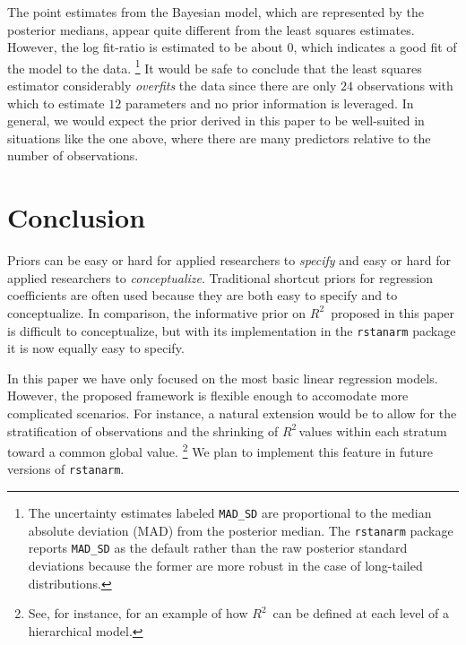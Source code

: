 \documentclass[11pt]{article}
\newcommand{\Rsq}{$R^2\,$}
\begin{document}
The point estimates from the Bayesian model, which are represented by the
posterior medians, appear quite different from the least squares estimates.
However, the log fit-ratio is estimated to be about $0$, which indicates a good
fit of the model to the data.%
\footnote{The uncertainty estimates labeled {\tt MAD\_SD} are proportional to
the median absolute deviation (MAD) from the posterior median. The
{\tt rstanarm} package reports {\tt MAD\_SD} as the default rather than the raw
posterior standard deviations because the former are more robust in the case of
long-tailed distributions.}
It would be safe to conclude that the least squares estimator considerably
\emph{overfits} the data since there are only $24$ observations with which to
estimate $12$ parameters and no prior information is leveraged. In general, we
would expect the prior derived in this paper to be well-suited in situations
like the one above, where there are many predictors relative to the number of
observations.


\section{Conclusion}

Priors can be easy or hard for applied researchers to \emph{specify} and easy or
hard for applied researchers to \emph{conceptualize}. Traditional shortcut
priors for regression coefficients are often used because they are both easy to
specify and to conceptualize. In comparison, the informative prior on \Rsq
proposed in this paper is difficult to conceptualize, but with its
implementation in the {\tt rstanarm} package it is now equally easy to specify.

In this paper we have only focused on the most basic linear regression models.
However, the proposed framework is flexible enough to accomodate more
complicated scenarios. For instance, a natural extension would be to allow for
the stratification of observations and the shrinking of \Rsq values within each
stratum toward a common global value.%
\footnote{See, for instance,  for an example of how \Rsq
can be defined at each level of a hierarchical model.}
We plan to implement this feature in future versions of {\tt rstanarm}.


\nocite{Rcore}
\nocite{HSAUR3-package}



\end{document}
